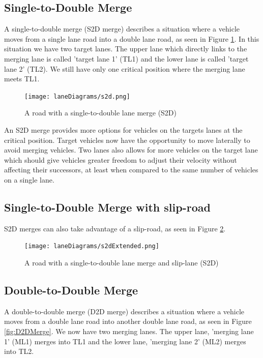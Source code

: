 \subsection{Single-to-Double Merge}
\label{subsec:Single-to-Double Merge}
A single-to-double merge (S2D merge) describes a situation where a vehicle moves from a single lane road into a double lane road, as seen in Figure \ref{fig:S2DMerge}. In this situation we have two target lanes. The upper lane which directly links to the merging lane is called 'target lane 1' (TL1) and the lower lane is called 'target lane 2' (TL2). We still have only one critical position where the merging lane meets TL1.

\begin{figure}[htb]
\texttt{[image: laneDiagrams/s2d.png]}
\caption{A road with a single-to-double lane merge (S2D)}
\label{fig:S2DMerge}
\end{figure}

An S2D merge provides more options for vehicles on the targets lanes at the critical position. Target vehicles now have the opportunity to move laterally to avoid merging vehicles. Two lanes also allows for more vehicles on the target lane which should give vehicles greater freedom to adjust their velocity without affecting their successors, at least when compared to the same number of vehicles on a single lane.

\subsection{Single-to-Double Merge with slip-road}
\label{subsec:Single-to-Double Merge with slip-road}

S2D merges can also take advantage of a slip-road, as seen in Figure \ref{fig:S2DMergeExtended}.

\begin{figure}[htb]
\texttt{[image: laneDiagrams/s2dExtended.png]}
\caption{A road with a single-to{}-double lane merge and slip-lane (S2D)}
\label{fig:S2DMergeExtended}
\end{figure}

\subsection{Double-to-Double Merge}
\label{subsec:Double-to-Double Merge}
A double-to-double merge (D2D merge) describes a situation where a vehicle moves from a double lane road into another double lane road, as seen in Figure \ref{fig:D2DMerge}. We now have two merging lanes. The upper lane, 'merging lane 1' (ML1) merges into TL1 and the lower lane, 'merging lane 2' (ML2) merges into TL2.

